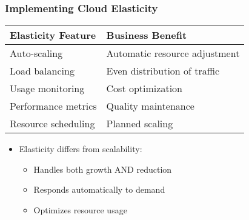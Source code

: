 \documentclass{beamer}
\begin{document}
\begin{frame}
    \frametitle{Implementing Cloud Elasticity}
    
    \begin{tabular}{|p{}|p{}|}
        \hline
        \textbf{Elasticity Feature} & \textbf{Business Benefit} \\
        \hline
        Auto-scaling & Automatic resource adjustment \\
        \hline
        Load balancing & Even distribution of traffic \\
        \hline
        Usage monitoring & Cost optimization \\
        \hline
        Performance metrics & Quality maintenance \\
        \hline
        Resource scheduling & Planned scaling \\
        \hline
    \end{tabular}
    
    \begin{itemize}
        \item Elasticity differs from scalability:
        \begin{itemize}
            \item Handles both growth AND reduction
            \item Responds automatically to demand
            \item Optimizes resource usage
        \end{itemize}
    \end{itemize}
\end{frame}
\end{document}
